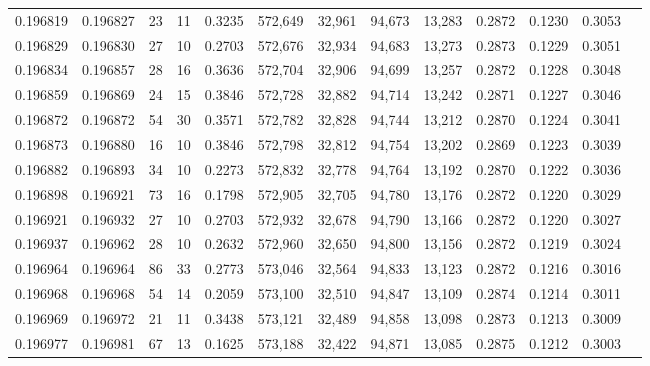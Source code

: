 \begin{tabular}{rrrrrrrrrrrrr}
0.196819 & 0.196827 &    23 &  11 &                                     0.3235 & 572,649 &  32,961 &  94,673 &  13,283 & 0.2872 & 0.1230 & 0.3053 \\
0.196829 & 0.196830 &    27 &  10 &                                     0.2703 & 572,676 &  32,934 &  94,683 &  13,273 & 0.2873 & 0.1229 & 0.3051 \\
0.196834 & 0.196857 &    28 &  16 &                                     0.3636 & 572,704 &  32,906 &  94,699 &  13,257 & 0.2872 & 0.1228 & 0.3048 \\
0.196859 & 0.196869 &    24 &  15 &                                     0.3846 & 572,728 &  32,882 &  94,714 &  13,242 & 0.2871 & 0.1227 & 0.3046 \\
0.196872 & 0.196872 &    54 &  30 &                                     0.3571 & 572,782 &  32,828 &  94,744 &  13,212 & 0.2870 & 0.1224 & 0.3041 \\
0.196873 & 0.196880 &    16 &  10 &                                     0.3846 & 572,798 &  32,812 &  94,754 &  13,202 & 0.2869 & 0.1223 & 0.3039 \\
0.196882 & 0.196893 &    34 &  10 &                                     0.2273 & 572,832 &  32,778 &  94,764 &  13,192 & 0.2870 & 0.1222 & 0.3036 \\
0.196898 & 0.196921 &    73 &  16 &                                     0.1798 & 572,905 &  32,705 &  94,780 &  13,176 & 0.2872 & 0.1220 & 0.3029 \\
0.196921 & 0.196932 &    27 &  10 &                                     0.2703 & 572,932 &  32,678 &  94,790 &  13,166 & 0.2872 & 0.1220 & 0.3027 \\
0.196937 & 0.196962 &    28 &  10 &                                     0.2632 & 572,960 &  32,650 &  94,800 &  13,156 & 0.2872 & 0.1219 & 0.3024 \\
0.196964 & 0.196964 &    86 &  33 &                                     0.2773 & 573,046 &  32,564 &  94,833 &  13,123 & 0.2872 & 0.1216 & 0.3016 \\
0.196968 & 0.196968 &    54 &  14 &                                     0.2059 & 573,100 &  32,510 &  94,847 &  13,109 & 0.2874 & 0.1214 & 0.3011 \\
0.196969 & 0.196972 &    21 &  11 &                                     0.3438 & 573,121 &  32,489 &  94,858 &  13,098 & 0.2873 & 0.1213 & 0.3009 \\
0.196977 & 0.196981 &    67 &  13 &                                     0.1625 & 573,188 &  32,422 &  94,871 &  13,085 & 0.2875 & 0.1212 & 0.3003 \\

\end{tabular}
